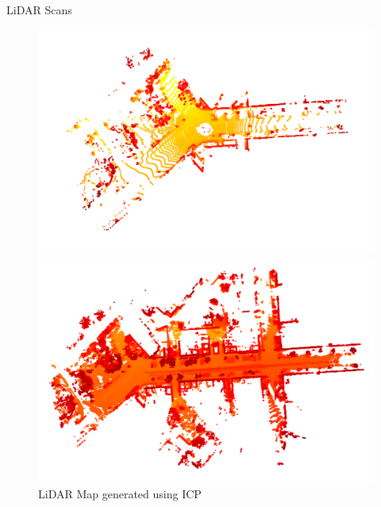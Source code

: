 \begin{frame}{LiDAR Scans}
\begin{figure}
    \centering
    \begin{minipage}{0.49\textwidth}
        \centering
        \includegraphics[width=\textwidth]{figures/lidar_frame.png}
        \caption{Sample LiDAR Frame}
    \end{minipage}
    \hfill
    \begin{minipage}{0.49\textwidth}
        \centering
        \includegraphics[width=\textwidth]{figures/lidar_map.png}
        \caption{LiDAR Map generated using ICP}
    \end{minipage}
\end{figure}
\end{frame}

